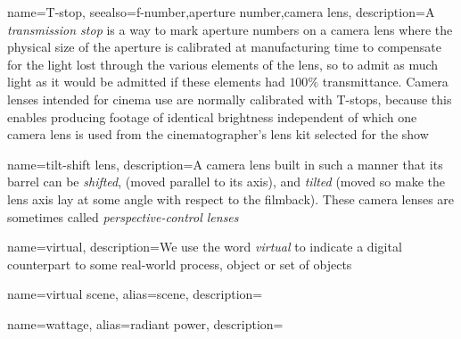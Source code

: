 {
	name={T-stop},
	seealso={f-number,aperture number,camera lens},
	description={A \textsl{transmission stop} is a way to mark aperture numbers on a camera lens
		where the physical size of the aperture is calibrated at manufacturing time 
		to compensate for the light lost through the various elements of the lens, 
		so to admit as much light as it would be admitted if these elements had $100\%$
		transmittance.
		Camera lenses intended for cinema use are normally calibrated with T-stops, 
		because this enables producing footage of identical brightness independent of
		which one camera lens is used from the cinematographer's lens kit selected for the show}
}

{
	name={tilt-shift lens},
	description={A camera lens built in such a manner that its barrel can be \emph{shifted},
		(moved parallel to its axis), and \emph{tilted} (moved so make the lens axis 
		lay at some angle with respect to the filmback). These camera lenses are sometimes called
		\emph{perspective-control lenses}}
}

{    
	name={virtual},
	description={We use the word \textsl{virtual} to indicate a digital counterpart to some
		real-world process, object or set of objects}
}

{
	name={virtual scene},
	alias={scene},
	description=\nopostdesc
}

{    
	name={wattage},
	alias={radiant power},
	description=\nopostdesc
}
